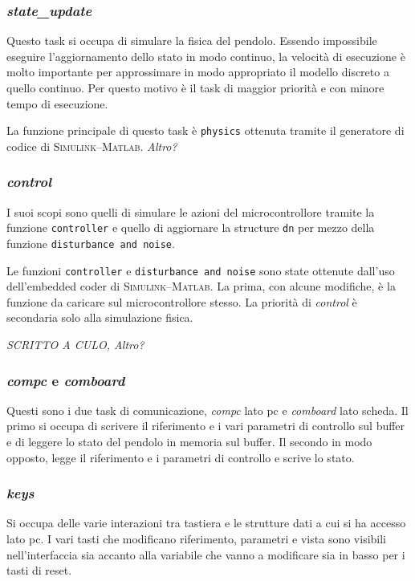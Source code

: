 \subsubsection{\textit{state\_update}}
Questo task si occupa di simulare la fisica del pendolo. Essendo impossibile eseguire l'aggiornamento dello stato in modo continuo, la velocit\`a di esecuzione \`e molto importante per approssimare in modo appropriato il modello discreto a quello continuo. Per questo motivo \`e il task di maggior priorit\`a e con minore tempo di esecuzione.

La funzione principale di questo task \`e \texttt{physics} ottenuta tramite il generatore di codice di \textsc{Simulink--Matlab}.
\textit{Altro?}

\subsubsection{\textit{control}}
I suoi scopi sono quelli di simulare le azioni del microcontrollore tramite la funzione \texttt{controller} e quello di aggiornare la structure \texttt{dn} per mezzo della funzione \texttt{disturbance and noise}. 

Le funzioni \texttt{controller} e \texttt{disturbance and noise} sono state ottenute dall'uso dell'em\-bed\-ded coder di \textsc{Simulink--Matlab}. La prima, con alcune modifiche, \`e la funzione da caricare sul microcontrollore stesso. La priorit\`a di \textit{control} \`e secondaria solo alla simulazione fisica.
 
\textit{SCRITTO A CULO, Altro?}

\subsubsection{\textit{compc} e \textit{comboard}}
Questi sono i due task di comunicazione, \textit{compc} lato pc e \textit{comboard} lato scheda. Il primo si occupa di scrivere il riferimento e i vari parametri di controllo sul buffer e di leggere lo stato del pendolo in memoria sul buffer. Il secondo in modo opposto, legge il riferimento e i parametri di controllo e scrive lo stato.

\subsubsection{\textit{keys}}
Si occupa delle varie interazioni tra tastiera e le strutture dati a cui si ha accesso lato pc. I vari tasti che modificano riferimento, parametri e vista sono visibili nell'interfaccia sia accanto alla variabile che vanno a modificare sia in basso per i tasti di reset.

